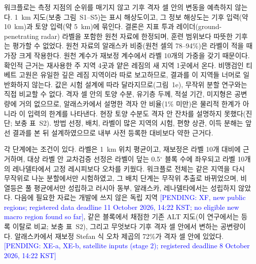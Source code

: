 워크플로는 측정 지점의 순위를 매기지 않고 기후 격자 셀 안의 변동을 예측하지 않는다. 1~km 지도(보충 그림~S1--S5)는 표시 해상도이고, 그 정보 해상도는 기후 입력(약 10~km)과 토양 입력(약 5~km)에 묶인다. 결론은 지표 투과 레이더(ground-penetrating radar) 라벨을 포함한 원천 자료에 한정되며, 훈련 범위보다 따뜻한 기후는 평가할 수 없었다. 원천 자료의 알래스카 비중(원천 셀의 78--94\%)은 라벨이 적을 때 가장 크게 작용한다. 원천 계수가 재보정 계수에서 라벨 10개의 가중을 갖기 때문이다. 확인적 근거는 재사용한 주 지역 4곳과 얕은 레짐의 새 지역 1곳에서 온다. 비맹검인 티베트 고원은 유일한 깊은 레짐 지역이라 따로 보고하므로, 결과를 이 지역들 너머로 일반화하지 않는다. 값은 시험 설계에 따라 달라지므로(그림~1e), 무작위 분할 연구와는 직접 비교할 수 없다. 격자 셀 안의 토양 수분, 유기층 두께, 적설 기간, 미지형은 공변량에 거의 없으므로, 알래스카에서 설명한 격자 안 비율(1\% 미만)은 물리적 한계가 아니라 이 입력의 한계를 나타낸다. 현장 토양 수분도 격자 안 잔차를 설명하지 못했다(진단; 보충 표~S2). 방법 선정, 배치, 라벨이 많은 지역의 시험, 편향 상관, 이득 분해는 앞선 결과를 본 뒤 설계하였으므로 내부 사전 등록한 대비보다 약한 근거다.

각 단계에는 조건이 있다. 라벨은 1~km 위치 평균이고, 재보정은 라벨 10개 대비에 근거하며, 대상 라벨 안 교차검증 선정은 라벨이 덮는 0.5$^{\circ}$ 블록 수에 좌우되고 라벨 10개의 레나델타에서 고정 레시피보다 오차를 키웠다. 워크플로 전체는 같은 지역을 다시 무작위로 나눈 분할에서만 시험하였고, 그 배치 단계는 무작위 추출로 바뀌었으며, 비열등은 풀 평균에서만 성립하고 러시아 동부, 알래스카, 레나델타에서는 성립하지 않았다. 다음에 필요한 자료는 개발에 쓰지 않은 독립 지역 \textcolor{blue}{[PENDING: XF, new public regions; registered data deadline 11 October 2026, 14:22 KST; no eligible new macro region found so far]}, 같은 블록에서 채점한 기존 ALT 지도\cite{Ran2022a,Wei2026}(이 연구에서는 등록 이탈로 비교; 보충 표~S2), 그리고 무엇보다 기후 격자 셀 안에서 변하는 공변량이다. 알래스카에서 재보정 Stefan 식 오차 제곱의 72\%가 격자 셀 안에 있었다. \textcolor{blue}{[PENDING: XE-a, XE-b, satellite inputs (stage 2); registered deadline 8 October 2026, 14:22 KST]}
